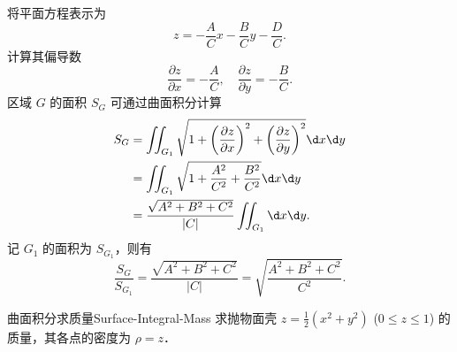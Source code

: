\begin{myproof}

    将平面方程表示为
    \begin{equation}
        z = -\frac{A}{C}x - \frac{B}{C}y - \frac{D}{C}.
    \end{equation}
    计算其偏导数
    \begin{equation}
        \frac{\partial z}{\partial x} = -\frac{A}{C}, \quad \frac{\partial z}{\partial y} = -\frac{B}{C}.
    \end{equation}
    区域 $G$ 的面积 $S_G$ 可通过曲面积分计算
    \begin{equation}
        \begin{aligned}
            S_G & = \iint_{G_1} \sqrt{1 + \left( \frac{\partial z}{\partial x} \right)^2 + \left( \frac{\partial z}{\partial y} \right)^2} \d x \d y \\
                & = \iint_{G_1} \sqrt{1 + \frac{A^2}{C^2} + \frac{B^2}{C^2}} \d x \d y                                                               \\
                & = \frac{\sqrt{A^2 + B^2 + C^2}}{|C|} \iint_{G_1} \d x \d y.
        \end{aligned}
    \end{equation}
    记 $G_1$ 的面积为 $S_{G_1}$，则有
    \begin{equation}
        \frac{S_G}{S_{G_1}} = \frac{\sqrt{A^2 + B^2 + C^2}}{|C|} = \sqrt{\frac{A^2 + B^2 + C^2}{C^2}}.
    \end{equation}
\end{myproof}

\begin{problem}{曲面积分求质量}{Surface-Integral-Mass}
    求抛物面壳 $z = \frac{1}{2}(x^2 + y^2)$ ($0 \le z \le 1$) 的质量，其各点的密度为 $\rho = z$．
\end{problem}

